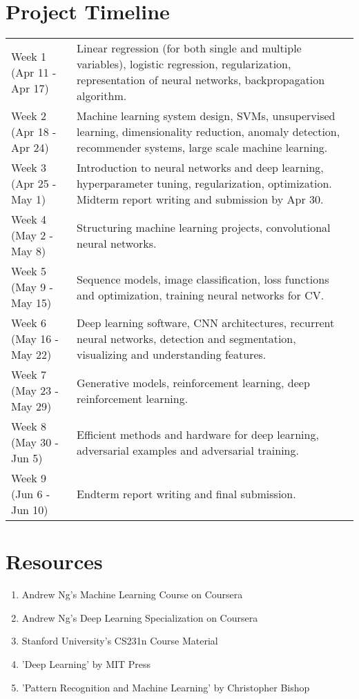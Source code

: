 \documentclass[a4paper, 12pt]{article}
\begin{document}
\section{Project Timeline}
\begin{tabular}{p{4.6cm}|p{8.8cm}}
Week 1 (Apr 11 - Apr 17)
&
Linear regression (for both single and multiple variables), logistic regression, regularization, representation of neural networks, backpropagation algorithm.
\\
[3mm]
Week 2 (Apr 18 - Apr 24)
&
Machine learning system design, SVMs, unsupervised learning, dimensionality reduction, anomaly detection, recommender systems, large scale machine learning.
\\
[3mm]
Week 3 (Apr 25 - May 1)
&
Introduction to neural networks and deep learning, hyperparameter tuning, regularization, optimization. Midterm report writing and submission by Apr 30.
\\
[3mm]
Week 4 (May 2 - May 8)
&
Structuring machine learning projects, convolutional neural networks.
\\
[3mm]
Week 5 (May 9 - May 15)
&
Sequence models, image classification, loss functions and optimization, training neural networks for CV.
\\
[3mm]
Week 6 (May 16 - May 22)
&
Deep learning software, CNN architectures, recurrent neural networks, detection and segmentation, visualizing and understanding features.
\\
[3mm]
Week 7 (May 23 - May 29)
&
Generative models, reinforcement learning, deep reinforcement learning.
\\
[3mm]
Week 8 (May 30 - Jun 5)
&
Efficient methods and hardware for deep learning, adversarial examples and adversarial training.
\\
[3mm]
Week 9 (Jun 6 - Jun 10)
&
Endterm report writing and final submission.
\\
\end{tabular}

\section{Resources}
\begin{enumerate}
\item Andrew Ng's Machine Learning Course on Coursera
\item Andrew Ng's Deep Learning Specialization on Coursera
\item Stanford University's CS231n Course Material
\item 'Deep Learning' by MIT Press
\item 'Pattern Recognition and Machine Learning' by Christopher Bishop
\end{enumerate}
\end{document}
